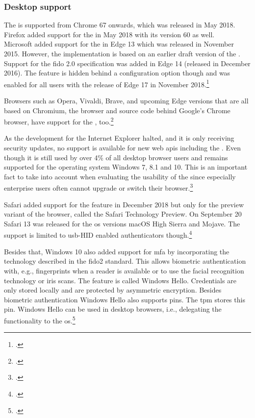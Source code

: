 \subsubsection{Desktop support}

The \wa{} is supported from Chrome 67 onwards, which was released in May 2018. Firefox added support for the \wa{} in May 2018 with its version 60 as well.\\
Microsoft added support for the \wa{} in Edge 13 which was released in November 2015. However, the implementation is based on an earlier draft version of the \wa. Support for the \gls{fido} 2.0 specification was added in Edge 14 (released in December 2016). The feature is hidden behind a configuration option though and was enabled for all users with the release of Edge 17 in November 2018.\footcite[See][112]{Jacobs:2019}

Browsers such as Opera, Vivaldi, Brave, and upcoming Edge versions that are all based on Chromium, the browser and source code behind Google's Chrome browser, have support for the \wa, too.\footcites[See][Chapter 7.1]{kissell2019take}

As the development for the Internet Explorer halted, and it is only receiving security updates, no support is available for new web \glspl{api} including the \wa. Even though it is still used by over 4\% of all desktop browser users and remains supported for the operating system Windows 7, 8.1 and 10. This is an important fact to take into account when evaluating the usability of the \wa{} since especially enterprise users often cannot upgrade or switch their browser.\footcites[See][]{ie-support}[See][]{statcounter-desktop}

Safari added support for the \wa{} feature in December 2018 but only for the preview variant of the browser, called the Safari Technology Preview. On September 20 Safari 13 was released for the \gls{os} versions macOS High Sierra and Mojave. The support is limited to \gls{usb}-HID enabled authenticators though.\footcites[See][]{safari-webauthn}[See][]{safari-13-release}

Besides that, Windows 10 also added support for \gls{mfa} by incorporating the technology described in the \gls{fido}2 standard. This allows biometric authentication with, e.g., fingerprints when a reader is available or to use the facial recognition technology or iris scans. The feature is called \frqq Windows Hello\flqq{}. Credentials are only stored locally and are protected by asymmetric encryption. Besides biometric authentication Windows Hello also supports \glspl{pin}. The \gls{tpm} stores this \gls{pin}. Windows Hello can be used in desktop browsers, i.e., delegating the \wa{} functionality to the \gls{os}.\footcites[See][]{201612}[See][6]{fido-whitepaper-amd}

